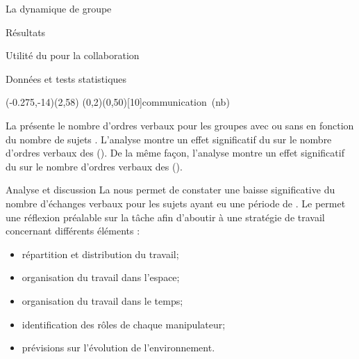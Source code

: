 \documentclass[myfrancais]{mythesis}
\begin{document}
\begin{mychapter}{La dynamique de groupe}
\begin{mysection}{Résultats}
\begin{mysubsection}{Utilité du \mybrainstorming pour la collaboration}
\begin{mysubsubsection}{Données et tests statistiques}
					\begin{myfigure}
						\begin{myps}(-0.275,-14)(2,58)
							\myaxes(0,2){\mybrainstorming}(0,50)[10]{communication~(nb)}
						\end{myps}
					\end{myfigure}

					La  présente le nombre d'ordres verbaux  pour les groupes avec ou sans \mybrainstorming {} en fonction du nombre de sujets .
					L'analyse montre un effet significatif du \mybrainstorming {} sur le nombre d'ordres verbaux  des  ().
					De la même façon, l'analyse montre un effet significatif du \mybrainstorming {} sur le nombre d'ordres verbaux  des  ().
				\end{mysubsubsection}
				\begin{mysubsubsection}{Analyse et discussion}
					La  nous permet de constater une baisse significative du nombre d'échanges verbaux pour les sujets ayant eu une période de \mybrainstorming.
					Le \mybrainstorming permet une réflexion préalable sur la tâche afin d'aboutir à une stratégie de travail concernant différents éléments :
					\begin{itemize}
						\item répartition et distribution du travail;
						\item organisation du travail dans l'espace;
						\item organisation du travail dans le temps;
						\item identification des rôles de chaque manipulateur;
						\item prévisions sur l'évolution de l'environnement.
					\end{itemize}


\end{mysubsubsection}
\end{mysubsection}
\end{mysection}
\end{mychapter}
\end{document}
